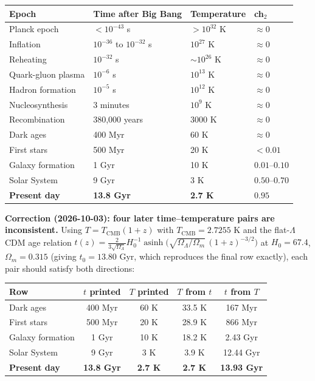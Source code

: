 \begin{level2}
\begin{center}
\begin{tabular}{llll}
\toprule
\textbf{Epoch} & \textbf{Time after Big Bang} & \textbf{Temperature} & \textbf{ch$_2$} \\
\midrule
Planck epoch & $< 10^{-43}$ s & $> 10^{32}$ K & $\approx 0$ \\
Inflation & $10^{-36}$ to $10^{-32}$ s & $10^{27}$ K & $\approx 0$ \\
Reheating & $10^{-32}$ s & $\sim 10^{26}$ K & $\approx 0$ \\
Quark-gluon plasma & $10^{-6}$ s & $10^{13}$ K & $\approx 0$ \\
Hadron formation & $10^{-5}$ s & $10^{12}$ K & $\approx 0$ \\
Nucleosynthesis & 3 minutes & $10^9$ K & $\approx 0$ \\
Recombination & 380,000 years & 3000 K & $\approx 0$ \\
Dark ages & 400 Myr & 60 K & $\approx 0$ \\
First stars & 500 Myr & 20 K & $< 0.01$ \\
Galaxy formation & 1 Gyr & 10 K & $0.01\text{--}0.10$ \\
Solar System & 9 Gyr & 3 K & $0.50\text{--}0.70$ \\
\textbf{Present day} & \textbf{13.8 Gyr} & \textbf{2.7 K} & $\mathbf{0.95}$ \\
\bottomrule
\end{tabular}
\label{tab:cosmic-timeline}
\end{center}

\medskip
\noindent\textbf{Correction (2026-10-03): four later time--temperature pairs are
inconsistent.}
Using $T = T_{\mathrm{CMB}}(1+z)$ with $T_{\mathrm{CMB}} = 2.7255$ K and the
flat-$\Lambda$CDM age relation
$t(z) = \tfrac{2}{3\sqrt{\Omega_\Lambda}}H_0^{-1}\operatorname{asinh}\!\bigl(\sqrt{\Omega_\Lambda/\Omega_m}\,(1+z)^{-3/2}\bigr)$
at $H_0 = 67.4$, $\Omega_m = 0.315$ (giving $t_0 = 13.80$ Gyr, which reproduces
the final row exactly), each pair should satisfy both directions:

\begin{center}
\begin{tabular}{lcccc}
\toprule
\textbf{Row} & \textbf{$t$ printed} & \textbf{$T$ printed} & \textbf{$T$ from $t$} & \textbf{$t$ from $T$} \\
\midrule
Dark ages        & 400 Myr   & 60 K  & 33.5 K & 167 Myr \\
First stars      & 500 Myr   & 20 K  & 28.9 K & 866 Myr \\
Galaxy formation & 1 Gyr     & 10 K  & 18.2 K & 2.43 Gyr \\
Solar System     & 9 Gyr     & 3 K   & 3.9 K  & 12.44 Gyr \\
\textbf{Present day} & \textbf{13.8 Gyr} & \textbf{2.7 K} & \textbf{2.7 K} & \textbf{13.93 Gyr} \\
\bottomrule
\end{tabular}
\end{center}


\end{level2}
